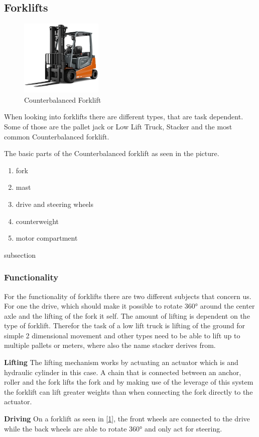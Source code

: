 \documentclass[../report.tex]{subfiles}
\begin{document}
\subsection{Forklifts}

\begin{figure}
    \includegraphics[width=0.35\textwidth]{../image/baltic.toyota-forklifts.jpeg}
    \caption{Counterbalanced Forklift}
    \label{fig:forklift}
\end{figure}
When looking into forklifts there are different types, that are task dependent.
Some of those are the pallet jack or Low Lift Truck, Stacker and the most common Counterbalanced forklift.

The basic parts of the Counterbalanced forklift as seen in the picture.
\begin{center}
    \begin{enumerate}
    \item fork
    \item mast
    \graphicspath{{\subfix{../image/}}}
    \item drive and steering wheels 
    \item counterweight
    \item motor compartment
    \end{enumerate}
\end{center}
subsection
\subsubsection{Functionality}
For the functionality of forklifts there are two different subjects that concern us.
For one the drive, which should make it possible to rotate 360° around the center axle
and the lifting of the fork it self.
The amount of lifting is dependent on the type of forklift. Therefor the task of a low lift 
truck is lifting of the ground for simple 2 dimensional movement and other types need
to be able to lift up to multiple pallets or meters, where also the name stacker derives from.

\textbf{Lifting}
The lifting mechanism works by actuating an actuator which is and hydraulic cylinder in this 
case. A chain that is connected between an anchor, roller and the fork lifts the fork and by 
making use of the leverage of this system the forklift can lift greater weights than when 
connecting the fork directly to the actuator.

\textbf{Driving}
On a forklift as seen in [\ref{fig:forklift}], the front wheels are connected to the drive
while the back wheels are able to rotate 360° and only act for steering.
\end{document}
